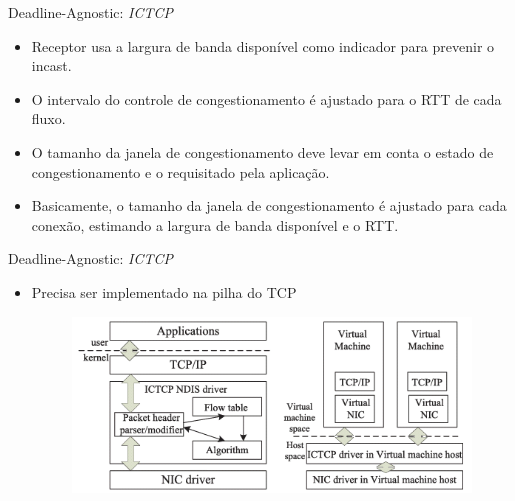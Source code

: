 \documentclass[aspectratio=169]{beamer}
\begin{document}
	
	\begin{frame} {Deadline-Agnostic: \textit{ICTCP}}
	                
	    \Large
	    \begin{itemize}
	    
	        \item
	            Receptor usa a largura de banda disponível como indicador para prevenir o incast.
	        \item
	            O intervalo do controle de congestionamento é ajustado para o RTT de cada fluxo.
	        \item
	            O tamanho da janela de congestionamento deve levar em conta o estado de congestionamento e o requisitado pela aplicação.
	        \item
	            Basicamente, o tamanho da janela de congestionamento é ajustado para cada conexão, estimando a largura de banda disponível e o RTT.
	    \end{itemize}
	  
	\end{frame}
	
	\begin{frame} {Deadline-Agnostic: \textit{ICTCP}}
	    
	    \Large
	    \begin{itemize}
	                           
	    \item
	      Precisa ser implementado na pilha do TCP
	  
	    \begin{figure}[ht]    
	        \includegraphics[scale=0.7]{imagens/ictcp_pilha.png}
	    \end{figure}
	        
	  \end{itemize}
	    
	\end{frame}  
\end{document}
